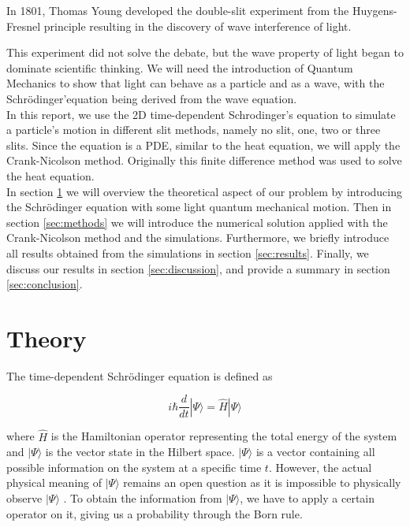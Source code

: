 \documentclass[english,notitlepage,reprint,nofootinbib]{revtex4-2}  %
\begin{document}
	In 1801, Thomas Young developed the double-slit experiment from the Huygens-Fresnel principle
	resulting in the discovery of wave interference of light\cite{ThomasYoung}.


	This experiment did not solve the debate, but the wave property of light began to dominate
	scientific thinking. We will need the introduction of Quantum Mechanics to show that
	light can behave as a particle and as a wave, with the Schrödinger'equation being derived
	from the wave equation. \\

	In this report, we use the 2D time-dependent Schrodinger's equation to simulate a particle's
	motion in different slit methods, namely no slit, one, two or three slits. Since the equation is a PDE, similar to the heat equation, we will apply the Crank-Nicolson method.
Originally this finite difference method was used to solve the heat equation\cite{Crank1947APM}. \\

	In section \ref{sec:theory} we will overview the theoretical aspect of our problem by introducing
	the Schrödinger equation with some light quantum mechanical motion. Then in section \ref{sec:methods}
	we will introduce the numerical solution applied with the Crank-Nicolson method and the simulations. Furthermore, we briefly introduce all results obtained from the simulations in section
	\ref{sec:results}. Finally, we discuss our results in section \ref{sec:discussion}, and provide a summary
	in section \ref{sec:conclusion}.

	\section{Theory} \label{sec:theory}
	The time-dependent Schrödinger equation is defined as

	\begin{equation}
	i \hbar \frac{d}{d t}|\Psi\rangle=\hat{H}|\Psi\rangle \label{eq:schro_eq}
	\end{equation}

	where $\hat{H}$ is the Hamiltonian operator representing the total energy of the system
	and $|\Psi\rangle$ is the vector state in the Hilbert space. $|\Psi\rangle$ is a vector
	containing all possible information on the system at a specific time $t$. However, the actual physical meaning of $|\Psi\rangle$ remains an open question as it is impossible to
	physically observe $|\Psi\rangle$ \cite{griffiths:quantumn}. To obtain the information
	from $|\Psi\rangle$, we have to apply a certain operator on it, giving us a probability
	through the Born rule.\\
\end{document}
